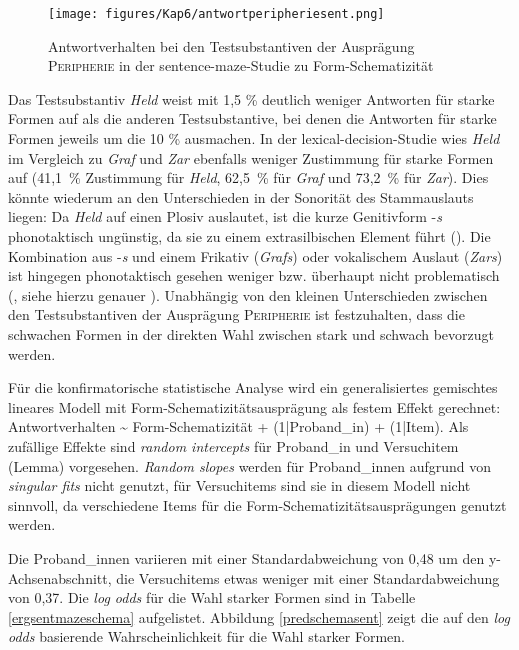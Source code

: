 \begin{figure}
\texttt{[image: figures/Kap6/antwortperipheriesent.png]} 
\caption{Antwortverhalten bei den Testsubstantiven der Ausprägung \textsc{Peripherie} in der sentence-maze-Studie zu Form-Schematizität}
\label{schemasentwafper}
\end{figure}

Das Testsubstantiv \textit{Held} weist mit 1,5 \% deutlich weniger Antworten für starke Formen auf als die anderen Testsubstantive, bei denen die Antworten für starke Formen jeweils um die 10 \% ausmachen. In der lexical-decision-Studie wies \textit{Held} im Vergleich zu \textit{Graf} und \textit{Zar} ebenfalls weniger Zustimmung für starke Formen auf (41,1~\% Zustimmung für \textit{Held}, 62,5~\% für \textit{Graf} und 73,2~\% für \textit{Zar}). Dies könnte wiederum an den Unterschieden in der Sonorität des Stammauslauts liegen: Da \textit{Held} auf einen Plosiv auslautet, ist die kurze Genitivform -\textit{s} phonotaktisch ungünstig, da sie zu einem extrasilbischen Element führt (\cite[114]{Szczepaniak.2010}). Die Kombination aus -\textit{s} und einem Frikativ (\textit{Grafs}) oder vokalischem Auslaut (\textit{Zars}) ist hingegen phonotaktisch gesehen weniger bzw. überhaupt nicht problematisch (\cite{Szczepaniak.2010}, siehe hierzu genauer ). Unabhängig von den kleinen Unterschieden zwischen den Testsubstantiven der Ausprägung \textsc{Peripherie} ist festzuhalten, dass die schwachen Formen in der direkten Wahl zwischen stark und schwach bevorzugt werden. 

Für die konfirmatorische statistische Analyse wird ein generalisiertes gemischtes lineares Modell mit Form-Schematizitätsausprägung als festem Effekt gerechnet: Antwortverhalten \~{} Form-Sche\-ma\-ti\-zi\-tät + (1|Proband\_in) + (1|Item). Als zufällige Effekte sind \textit{random intercepts} für Proband\_in und Versuchitem (Lemma) vorgesehen. \textit{Random slopes} werden für Proband\_innen aufgrund von \textit{singular fits} nicht genutzt, für Versuchitems sind sie in diesem Modell nicht sinnvoll, da verschiedene Items für die Form-Schematizitätsausprägungen genutzt werden.


Die Proband\_innen variieren mit einer Standardabweichung von 0,48 um den y-Ach\-sen\-ab\-schnitt, die Versuchitems etwas weniger mit einer Standardabweichung von 0,37. Die \textit{log odds} für die Wahl starker Formen sind in Tabelle \ref{ergsentmazeschema} aufgelistet. Abbildung \ref{predschemasent} zeigt die auf den \textit{log odds} basierende Wahrscheinlichkeit für die Wahl starker Formen.

